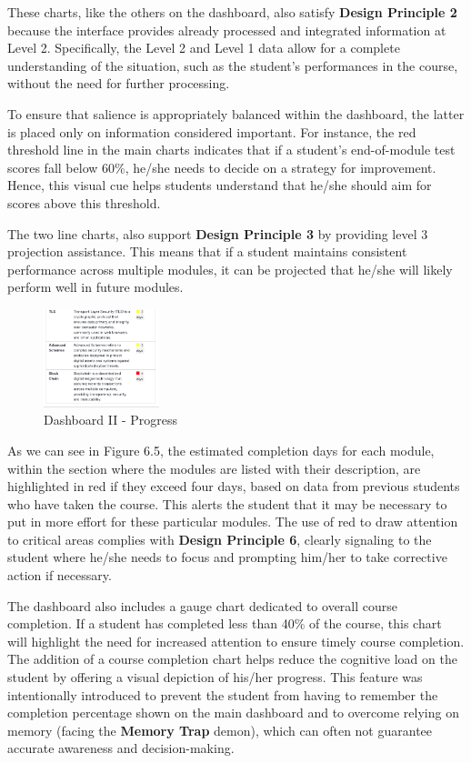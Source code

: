 These charts, like the others on the dashboard, also satisfy \textbf{Design Principle 2} because the interface provides already processed and integrated information at Level 2. Specifically, the Level 2 and Level 1 data allow for a complete understanding of the situation, such as the student's performances in the course, without the need for further processing.

To ensure that salience is appropriately balanced within the dashboard, the latter is placed only on information considered important. For instance, the red threshold line in the main charts indicates that if a student's end-of-module test scores fall below 60\%, he/she needs to decide on a strategy for improvement. Hence, this visual cue helps students understand that he/she should aim for scores above this threshold.

The two line charts, also support \textbf{Design Principle 3} by providing level 3 projection assistance. This means that if a student maintains consistent performance across multiple modules, it can be projected that he/she will likely perform well in future modules. 

\begin{figure}[H]
    \centering
    \includegraphics[width=0.3\textwidth]{assets/descriptionmodule.png}
    \caption{Dashboard II - Progress}
    \label{fig:dashboard_2} 
\end{figure}

As we can see in Figure 6.5, the estimated completion days for each module, within the section where the modules are listed with their description, are highlighted in red if they exceed four days, based on data from previous students who have taken the course. This alerts the student that it may be necessary to put in more effort for these particular modules.
The use of red to draw attention to critical areas complies with \textbf{Design Principle 6}, clearly signaling to the student where he/she needs to focus and prompting him/her to take corrective action if necessary.

The dashboard also includes a gauge chart dedicated to overall course completion. If a student has completed less than 40\% of the course, this chart will highlight the need for increased attention to ensure timely course completion.
The addition of a course completion chart helps reduce the cognitive load on the student by offering a visual depiction of his/her progress. This feature was intentionally introduced to prevent the student from having to remember the completion percentage shown on the main dashboard and to overcome relying on memory (facing the \textbf{Memory Trap} demon), which can often not guarantee accurate awareness and decision-making.

